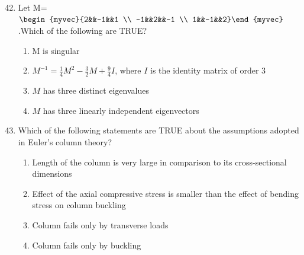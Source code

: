 \documentclass[journal]{IEEEtran}
\theoremstyle{remark}
\begin{document}
\begin{enumerate}[itemsep=1em]
\setcounter{enumi}{41}
\item Let M=$\begin{myvec}{2&&-1&&1 \\ -1&&2&&-1 \\ 1&&-1&&2}\end{myvec}$ .Which of the following are TRUE?

\begin{enumerate}[leftmargin=2.5em, labelsep=0.5em, itemsep=0.5em]
    \item M is singular
    \item $M^{-1}=\frac{1}{4}M^2-\frac{3}{2}M+\frac{9}{4}I$, where $I$ is the identity matrix of order 3 
    \item $M$ has three distinct eigenvalues 
    \item $M$ has three linearly independent eigenvectors 
\end{enumerate}
\end{enumerate}


\begin{enumerate}[itemsep=1em]
\setcounter{enumi}{42}
\item Which of the following statements are TRUE about the assumptions adopted in Euler's column theory? 
\begin{enumerate}[leftmargin=2.5em, labelsep=0.5em, itemsep=0.5em]
    \item Length of the column is very large in comparison to its cross-sectional dimensions
    \item Effect of the axial compressive stress is smaller than the effect of bending stress on column buckling
    \item Column fails only by transverse loads 
    \item Column fails only by buckling 
\end{enumerate}
\end{enumerate}
\end{document}
